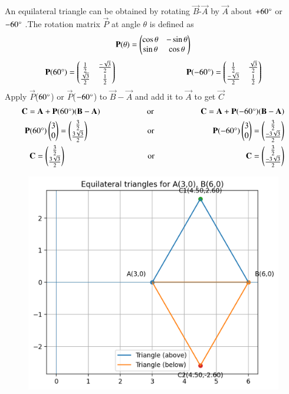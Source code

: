 \documentclass[journal]{IEEEtran}
\begin{document}
An equilateral triangle can be obtained by rotating $\Vec{B}$-$\vec{A}$ by $\Vec{A}$ about $+60\degree$ or $-60\degree$ .The rotation matrix $\vec{P}$ at angle $\theta$ is defined as\\
\vspace{0.5cm}
\begin{align}
    \Vec{P}(\theta)=\myvec{
   \cos \theta & -\sin \theta
    \\
   \sin \theta & \cos \theta
   }\\
\end{align}
\begin{align}
    \vec{P}(60\degree)=\myvec{
   \frac{1}{2} & \frac{-\sqrt{3}}{2}
    \\
   \frac{\sqrt{3}}{2} & \frac{1}{2}
   } \hspace{3cm}
   \vec{P}(-60\degree)=\myvec{
   \frac{1}{2} & \frac{\sqrt{3}}{2}
    \\
   \frac{-\sqrt{3}}{2} & \frac{1}{2}
   }\\
\end{align}
Apply $\vec{P}$($60\degree$) or $\vec{P}$($-60\degree$) to $\Vec{B}-\vec{A}$ and add it to $\Vec{A}$ to get $\vec{C}$\\
\begin{align}
    \vec{C}=\vec{A}+\vec{P}(60\degree)(\Vec{B}-\vec{A})\hspace{2cm} \text{or} \hspace{2cm}\vec{C}=\vec{A}+\vec{P}(-60\degree)(\Vec{B}-\vec{A})\\
    \vec{P}(60\degree)\myvec{3\\0}=\myvec{\frac{3}{2}\\\frac{3\sqrt{3}}{2}} \hspace{2.5cm} \text{or} \hspace{2.5cm} \vec{P}(-60\degree)\myvec{3\\0}=\myvec{\frac{3}{2}\\\frac{-3\sqrt{3}}{2}}\\
    \vec{C}=\myvec{\frac{3}{2}\\\frac{3\sqrt{3}}{2}} \hspace{3.5cm} \text{or} \hspace{3.9cm} \vec{C}=\myvec{\frac{3}{2}\\\frac{-3\sqrt{3}}{2}}
\end{align}
 \begin{figure}[H]
    \centering
    \includegraphics[width=0.4\columnwidth]{figs/01.png}
    \label{fig-1}
\end{figure}
   


   
\end{document}
